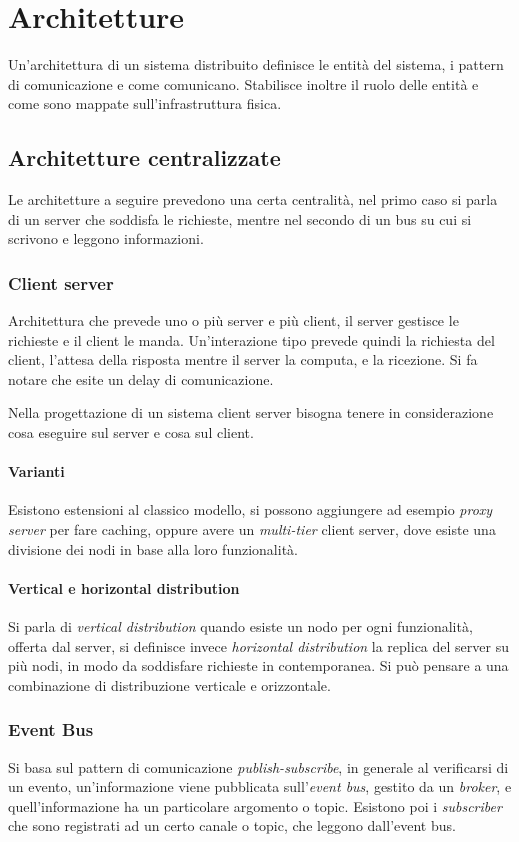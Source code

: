 \section{Architetture}
Un'architettura di un sistema distribuito definisce le entità 
del sistema, i pattern di comunicazione e come comunicano.
Stabilisce inoltre il ruolo delle entità e come sono mappate 
sull'infrastruttura fisica.

\subsection{Architetture centralizzate}
Le architetture a seguire prevedono una certa centralità, nel primo caso 
si parla di un server che soddisfa le richieste, mentre nel secondo 
di un bus su cui si scrivono e leggono informazioni.

\subsubsection{Client server}
Architettura che prevede uno o più server e più client, 
il server gestisce le richieste e il client le manda.
Un'interazione tipo prevede quindi la richiesta del client, 
l'attesa della risposta mentre il server la computa, e la ricezione.
Si fa notare che esite un delay di comunicazione.

Nella progettazione di un sistema client server bisogna tenere in considerazione
cosa eseguire sul server e cosa sul client.

\paragraph{Varianti}
Esistono estensioni al classico modello, si possono aggiungere ad esempio 
\emph{proxy server}
per fare caching, oppure avere un \emph{multi-tier} client server, dove esiste
una divisione dei nodi in base alla loro funzionalità.

\paragraph{Vertical e horizontal distribution}
Si parla di \emph{vertical distribution} quando esiste un nodo per ogni funzionalità, 
offerta dal server, si definisce invece \emph{horizontal distribution} la replica del 
server su più nodi, in modo da soddisfare richieste in contemporanea.
Si può pensare a una combinazione di distribuzione verticale e orizzontale.

\subsubsection{Event Bus}
Si basa sul pattern di comunicazione \emph{publish-subscribe}, in generale
al verificarsi di un evento, un'informazione viene pubblicata sull'\emph{event bus}, 
gestito da un \emph{broker}, e quell'informazione ha un particolare argomento 
o topic.
Esistono poi i \emph{subscriber} che sono registrati ad un certo canale o topic, 
che leggono dall'event bus.

